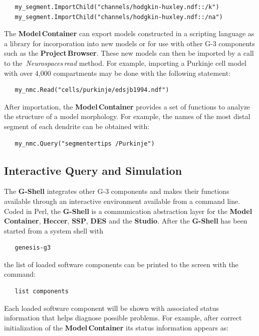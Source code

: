 \documentclass[10pt]{article}
\begin{document}
\begin{verbatim}
   my_segment.ImportChild("channels/hodgkin-huxley.ndf::/k")
   my_segment.ImportChild("channels/hodgkin-huxley.ndf::/na")
\end{verbatim}

The {\bf Model\,Container} can export models constructed in a
scripting language as a library for incorporation into new models or
for use with other G-3 components such as the {\bf Project\,Browser}.
These new models can then be imported by a call to the\,{\it
  Neurospaces}\,{\it read} method. For example, importing a Purkinje
cell model with over 4,000 compartments may be done with the following
statement:

\begin{verbatim}
   my_nmc.Read("cells/purkinje/edsjb1994.ndf")
\end{verbatim}

After importation, the {\bf Model\,Container} provides a set of
functions to analyze the structure of a model morphology.  For
example, the names of the most distal segment of each dendrite can be
obtained with:

\begin{verbatim}
   my_nmc.Query("segmentertips /Purkinje")
\end{verbatim}

\subsection*{Interactive Query and Simulation}

The {\bf G-Shell} integrates other
G-3 components and makes their functions available through an
interactive environment available from a command line.  Coded in Perl, the {\bf G-Shell} is a
communication abstraction layer for 
the {\bf Model\,Container}, {\bf Heccer}, {\bf SSP}, {\bf DES} and the {\bf
  Studio}.  After the {\bf G-Shell} has been started from a system
shell with
\begin{verbatim}
   genesis-g3
\end{verbatim}
the list of loaded software components can be printed to the screen with the command:

\begin{verbatim}
   list components
\end{verbatim}

Each loaded software component will be shown with associated status
information that helps diagnose possible problems.  For
example, after correct initialization of the {\bf Model\,Container} its
status information appears as:
\end{document}
